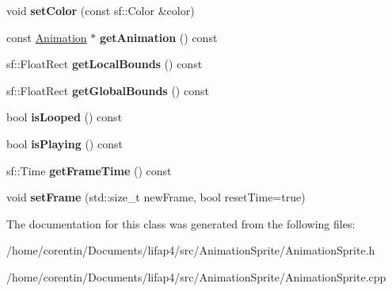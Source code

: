 \begin{DoxyCompactItemize}
void {\bfseries set\+Color} (const sf\+::\+Color \&color)
\item 
\mbox{\label{class_animated_sprite_a03bacdbaf638cb6f7987e342980206c2}} 
const \hyperlink{class_animation}{Animation} $\ast$ {\bfseries get\+Animation} () const
\item 
\mbox{\label{class_animated_sprite_ac4c88435c8698f452629c5cd78bfb3c9}} 
sf\+::\+Float\+Rect {\bfseries get\+Local\+Bounds} () const
\item 
\mbox{\label{class_animated_sprite_a86dca0906c53b3e630aaeac2f0085a0e}} 
sf\+::\+Float\+Rect {\bfseries get\+Global\+Bounds} () const
\item 
\mbox{\label{class_animated_sprite_aaf2c2fb0e1487e689af4a6bbeb7e3e85}} 
bool {\bfseries is\+Looped} () const
\item 
\mbox{\label{class_animated_sprite_a55f450add05d45e5369a6ad24f9e438f}} 
bool {\bfseries is\+Playing} () const
\item 
\mbox{\label{class_animated_sprite_a5291f8e24fe2c6e4284bc7ff9499ef77}} 
sf\+::\+Time {\bfseries get\+Frame\+Time} () const
\item 
\mbox{\label{class_animated_sprite_a0b3e38fffdc1d29f46fa08df9ef2a747}} 
void {\bfseries set\+Frame} (std\+::size\+\_\+t new\+Frame, bool reset\+Time=true)
\end{DoxyCompactItemize}


The documentation for this class was generated from the following files\+:\begin{DoxyCompactItemize}
\item 
/home/corentin/\+Documents/lifap4/src/\+Animation\+Sprite/Animation\+Sprite.\+h\item 
/home/corentin/\+Documents/lifap4/src/\+Animation\+Sprite/Animation\+Sprite.\+cpp\end{DoxyCompactItemize}
